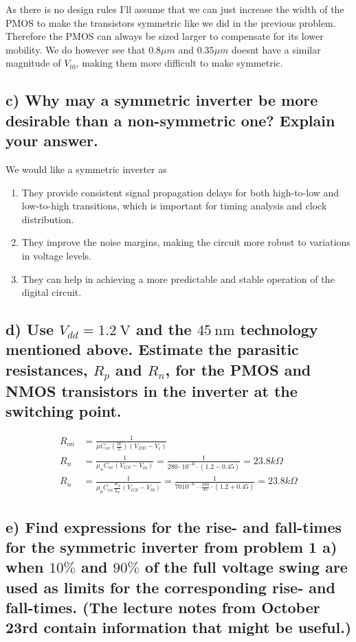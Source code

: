 As there is no design rules I'll assume that we can just increase the width of the PMOS to make the transistors symmetric like we did in the previous problem. Therefore the PMOS can always be sized larger to compensate for its lower mobility. We do however see that $0.8 \mu m$ and $0.35 \mu m$ doesnt have a similar magnitude of $V_{t0}$, making them more difficult to make symmetric.

\subsection*{c) Why may a symmetric inverter be more desirable than a non-symmetric one? Explain your answer.}

We would like a symmetric inverter as
\begin{enumerate}
    \item They provide consistent signal propagation delays for both high-to-low and low-to-high transitions, which is important for timing analysis and clock distribution.
    \item They improve the noise margins, making the circuit more robust to variations in voltage levels.
    \item They can help in achieving a more predictable and stable operation of the digital circuit.
\end{enumerate}

\subsection*{d) Use $V_{d d}=1.2 \mathrm{~V}$ and the $45 \mathrm{~nm}$ technology mentioned above. Estimate the parasitic resistances, $R_p$ and $R_n$, for the PMOS and NMOS transistors in the inverter at the switching point.}

$$
\begin{aligned}
    R_{o n}&=\frac{1}{\mu C_{o x}\left(\frac{W}{L}\right)\left(V_{D D}-V_t\right)}\\
    R_{n}&=\frac{1}{\mu_nC_{ox}\left(V_{GS}-V_{t0}\right)}=\frac{1}{280\cdot10^{-6}\cdot\left(1.2-0.45\right)}=23.8 k\Omega\\
    R_{n}&=\frac{1}{\mu_pC_{ox}\frac{W_p}{L_p}\left(V_{GS}-V_{t0}\right)}=\frac{1}{7010^{-6}\cdot\cdot\frac{180}{45}\cdot\left(1.2+0.45\right)}=23.8 k\Omega 
\end{aligned}
$$


\subsection*{e) Find expressions for the rise- and fall-times for the symmetric inverter from problem 1 a) when $10 \%$ and $90 \%$ of the full voltage swing are used as limits for the corresponding rise- and fall-times. (The lecture notes from October 23rd contain information that might be useful.)}


